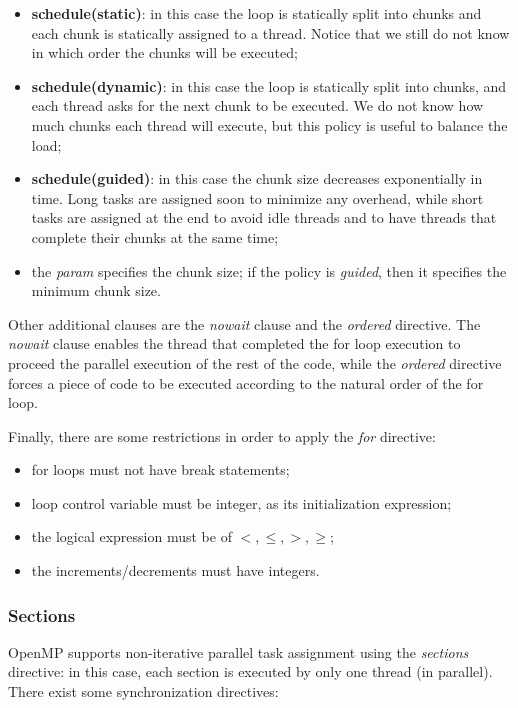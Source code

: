 \begin{itemize}
    \item \textbf{schedule(static)}: in this case the loop is statically split into chunks and each chunk is statically assigned to a thread. Notice that we still do not know in which order the chunks will be executed;
    \item \textbf{schedule(dynamic)}: in this case the loop is statically split into chunks, and each thread asks for the next chunk to be executed. We do not know how much chunks each thread will execute, but this policy is useful to balance the load;
    \item \textbf{schedule(guided)}: in this case the chunk size decreases exponentially in time. Long tasks are assigned soon to minimize any overhead, while short tasks are assigned at the end to avoid idle threads and to have threads that complete their chunks at the same time;
    \item the \textit{param} specifies the chunk size; if the policy is \textit{guided}, then it specifies the minimum chunk size.
\end{itemize}

Other additional clauses are the \textit{nowait} clause and the \textit{ordered} directive. The \textit{nowait} clause enables the thread that completed the for loop execution to proceed the parallel execution of the rest of the code, while the \textit{ordered} directive forces a piece of code to be executed according to the natural order of the for loop. 

Finally, there are some restrictions in order to apply the \textit{for} directive:

\begin{itemize}
    \item for loops must not have break statements;
    \item loop control variable must be integer, as its initialization expression;
    \item the logical expression must be of $<, \leq, > , \geq$;
    \item the increments/decrements must have integers.
\end{itemize}

\subsubsection{Sections}
OpenMP supports non-iterative parallel task assignment using the \textit{sections} directive: in this case, each section is executed by only one thread (in parallel). There exist some synchronization directives:

